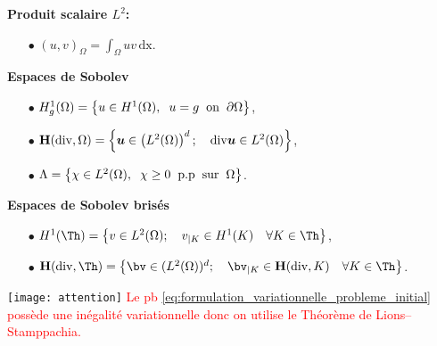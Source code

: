 \documentclass{beamer}
\renewcommand{\div}{\mathrm{div}}
\begin{document}
\begin{frame}
\textbf{Produit scalaire $L^2$:}
\begin{itemize}
\item[$\bullet$] $(u,v)_{\Omega}=\int_{\Omega} uv \,\mathrm{dx}$.
\end{itemize}
\textbf{Espaces de Sobolev}
\begin{itemize}
\item[$\bullet$] $H_g^1(\Omega)=\left\{u\in H^1(\Omega), \hspace{0.2 cm} u=g \hspace{0.2 cm} \mbox{on} \hspace{0.2 cm} \partial \Omega\right\}$,
\\
\item[$\bullet$] $\textbf H(\div,\Omega)=\left\{ {\bm u} \in \left(L^2(\Omega)\right)^d; \quad \div {\bm u}\in L^2(\Omega)\right\}$,
\\
\item[$\bullet$] $\Lambda=\left\{\chi\in L^2(\Omega), \hspace{0.2 cm} \chi \geq 0 \hspace{0.2 cm} \mbox{p.p} \hspace{0.2 cm} \mbox{sur} \hspace{0.2 cm} \Omega\right\}$.
\end{itemize}
\textbf{Espaces de Sobolev brisés}
\begin{itemize}
\item[$\bullet$] $H^1(\Th)=\left\{v \in L^2(\Omega); \quad v_{|K}\in H^1(K) \quad \forall K \in \Th\right\}$,\\
\item[$\bullet$] $\textbf H(\div,\Th)=\left\{\bv \in (L^2(\Omega))^d; \quad {\bv}_{|K} \in \textbf H(\div,K) \quad \forall K \in \Th \right\}$.
\end{itemize}
\texttt{[image: attention]} \quad \textcolor{red}{Le pb \eqref{eq:formulation_variationnelle_probleme_initial} possède une inégalité variationnelle donc on utilise le Théorème de Lions--Stamppachia.}
\end{frame}
\end{document}
